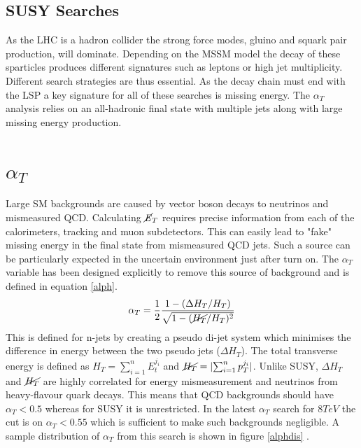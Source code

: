 \subsection{SUSY Searches}
As the LHC is a hadron collider the strong force modes, gluino and squark pair production, will dominate. Depending on the MSSM model the decay of these sparticles produces different signatures such as leptons or high jet multiplicity. Different search strategies are thus essential. As the decay chain must end with the LSP a key signature for all of these searches is missing energy. The $\alpha_T$ analysis relies on an all-hadronic final state with multiple jets along with large missing energy production. 

\section{$\alpha_T$}
Large SM backgrounds are caused by vector boson decays to neutrinos and mismeasured QCD. Calculating $\cancel{\it{E}}_{T}$ requires precise information from each of the calorimeters, tracking and muon subdetectors. This can easily lead to "fake" missing energy in the final state from mismeasured QCD jets\cite{randall}. Such a source can be particularly expected in the uncertain environment just after turn on.  The $\alpha_T$ variable has been designed explicitly to remove this source of background and is defined in equation \ref{alph}.
\begin{equation}
\label{alph}
\alpha_T=\frac{1}{2}\frac{1-(\Delta H_T/H_T)}{\sqrt{1-(\cancel{H_T}/H_T)^2}}
\end{equation}
This is defined for n-jets by creating a pseudo di-jet system which minimises the difference in energy between the two pseudo jets ($\Delta H_T$). The total transverse energy is defined as $H_T=\sum_{i=1}^nE_t^{j_i}$ and $\cancel{H_T}=|{\sum_{i=1}^n p_T^{j_i}}|$. Unlike SUSY, $\Delta H_T$ and $\cancel{H_T}$ are highly correlated for energy mismeasurement and neutrinos from heavy-flavour quark decays. This means that QCD backgrounds should have $\alpha_T<0.5$ whereas for SUSY it is unrestricted. In the latest $\alpha_T$ search for $8 TeV$ the cut is on $\alpha_T<0.55$ which is sufficient to make such backgrounds negligible. A sample distribution of $\alpha_T$ from this search is shown in figure \ref{alphdis} \cite{CMSAT8}.
